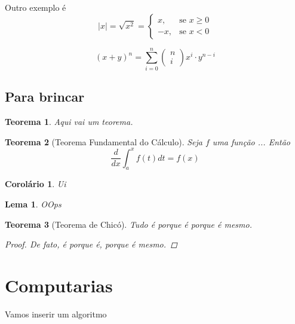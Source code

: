 \documentclass[10pt,a4paper,twocolumn]{book}
\newtheorem{teorema}{Teorema}
\newtheorem{corolario}{Corolário}[teorema]
\newtheorem{lema}{Lema}[corolario]
\begin{document}
			Outro exemplo é 
			\begin{equation}
				|x| = \sqrt{x^2} = 
					\begin{cases}
						x, &\text{se } x \ge 0 \\
						-x, &\text{se } x < 0 
					\end{cases}
			\end{equation}
			
			\begin{equation}
				(x+y)^n = \sum_{i=0}^{n} 
					\begin{pmatrix}
						n \\
						i
					\end{pmatrix}
				x^i\cdot y^{n-i}
			\end{equation}
			
	\subsection{Para brincar}
		\begin{teorema}
			Aqui vai um teorema.
		\end{teorema}
	
		\begin{teorema}[Teorema Fundamental do Cálculo]
			Seja $f$ uma função ...
			Então 
			\begin{equation}
			\frac{d}{dx}\int_{a}^{x}f(t)dt = f(x)
			\end{equation}
		\end{teorema}
	
		\begin{corolario}
			Ui		
		\end{corolario}
			
		\begin{lema}
			OOps
		\end{lema}
		
		\begin{teorema}[Teorema de Chicó] Tudo é porque é porque é mesmo.
			\begin{proof}
				De fato, é porque é, porque é mesmo.
			\end{proof}
		\end{teorema}
	
	
	\section{Computarias}
		Vamos inserir um algoritmo
\end{document}
